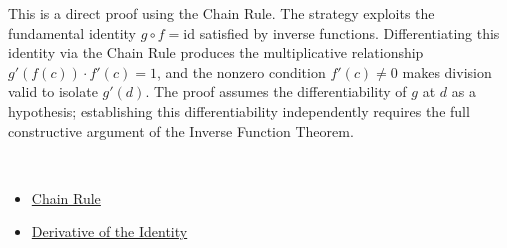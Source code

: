 \begin{remark*}
This is a direct proof using the Chain Rule. The strategy exploits the fundamental identity $g \circ f = \text{id}$ satisfied by inverse functions. Differentiating this identity via the Chain Rule produces the multiplicative relationship $g'(f(c)) \cdot f'(c) = 1$, and the nonzero condition $f'(c) \neq 0$ makes division valid to isolate $g'(d)$. The proof assumes the differentiability of $g$ at $d$ as a hypothesis; establishing this differentiability independently requires the full constructive argument of the Inverse Function Theorem.
\end{remark*}

\begin{remark*}[Dependencies]~\\
\begin{itemize}
  \item \hyperref[thm:chain-rule]{Chain Rule}
  \item \hyperref[prop:derivative-identity]{Derivative of the Identity}
\end{itemize}
\end{remark*}